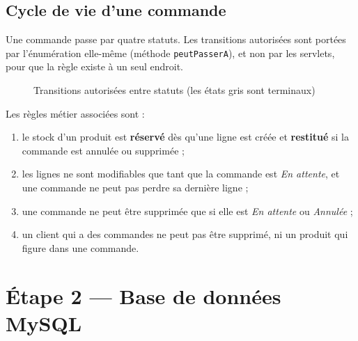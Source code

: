 \documentclass[11pt,a4paper]{report}
\begin{document}
\section{Cycle de vie d'une commande}
Une commande passe par quatre statuts. Les transitions autoris\'ees sont port\'ees par l'\'enum\'eration elle-m\^eme (m\'ethode \texttt{peutPasserA}), et non par les servlets, pour que la r\`egle existe \`a un seul endroit.

\begin{figure}[H]
\centering
{}
\caption{Transitions autoris\'ees entre statuts (les \'etats gris sont terminaux)}\label{fig:etats}
\end{figure}

Les r\`egles m\'etier associ\'ees sont :
\begin{enumerate}
  \item le stock d'un produit est \textbf{r\'eserv\'e} d\`es qu'une ligne est cr\'e\'ee et \textbf{restitu\'e} si la commande est annul\'ee ou supprim\'ee ;
  \item les lignes ne sont modifiables que tant que la commande est \emph{En attente}, et une commande ne peut pas perdre sa derni\`ere ligne ;
  \item une commande ne peut \^etre supprim\'ee que si elle est \emph{En attente} ou \emph{Annul\'ee} ;
  \item un client qui a des commandes ne peut pas \^etre supprim\'e, ni un produit qui figure dans une commande.
\end{enumerate}

\chapter{\'Etape 2 --- Base de donn\'ees MySQL}
\end{document}
